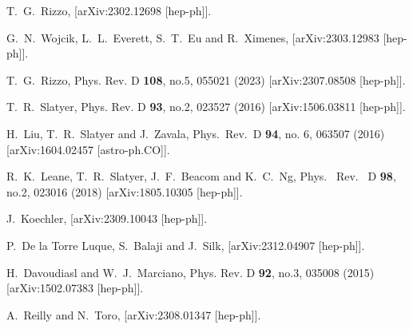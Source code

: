 \documentclass[14pt]{article}
\begin{document}
{\begin{thebibliography}{99}
T.~G.~Rizzo,
[arXiv:2302.12698 [hep-ph]].

G.~N.~Wojcik, L.~L.~Everett, S.~T.~Eu and R.~Ximenes,
[arXiv:2303.12983 [hep-ph]].

T.~G.~Rizzo,
Phys. Rev. D \textbf{108}, no.5, 055021 (2023)
[arXiv:2307.08508 [hep-ph]].

T.~R.~Slatyer,
Phys. Rev. D \textbf{93}, no.2, 023527 (2016)
[arXiv:1506.03811 [hep-ph]].

  H.~Liu, T.~R.~Slatyer and J.~Zavala,
  Phys.\ Rev.\ D {\bf 94}, no. 6, 063507 (2016)
  [arXiv:1604.02457 [astro-ph.CO]].

R.~K.~Leane, T.~R.~Slatyer, J.~F.~Beacom and K.~C.~Ng,
Phys. \ Rev. \ D \textbf{98}, no.2, 023016 (2018)
[arXiv:1805.10305 [hep-ph]].

J.~Koechler,
[arXiv:2309.10043 [hep-ph]].

P.~De la Torre Luque, S.~Balaji and J.~Silk,
[arXiv:2312.04907 [hep-ph]].

H.~Davoudiasl and W.~J.~Marciano,
Phys. Rev. D \textbf{92}, no.3, 035008 (2015)
[arXiv:1502.07383 [hep-ph]].

A.~Reilly and N.~Toro,
[arXiv:2308.01347 [hep-ph]].


\end{thebibliography}}
\end{document}
